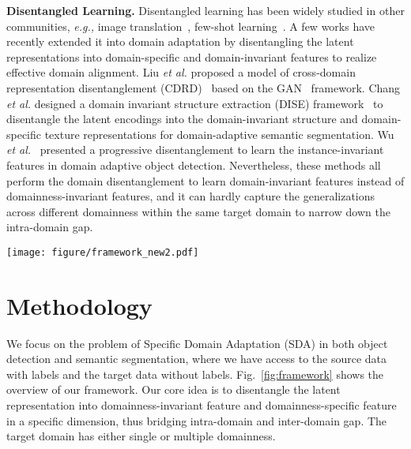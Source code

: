 \documentclass[10pt,journal,compsoc]{IEEEtran}
\begin{document}
\noindent \textbf{Disentangled Learning.} 
Disentangled learning has been widely studied in other communities, \emph{e.g.,} image translation~\cite{huang2018multimodal,lee2018diverse}, few-shot learning~\cite{ridgeway2018learning,scott2018adapted}. 
A few works have recently extended it into domain adaptation by disentangling the latent representations into domain-specific and domain-invariant features to realize effective domain alignment. 
Liu \emph{et al.} proposed a model of cross-domain representation disentanglement (CDRD)~\cite{liu2018detach} based on the GAN~\cite{GAN} framework. Chang \emph{et al.} designed a domain invariant structure extraction (DISE) framework~\cite{DISE} to disentangle the latent encodings into the domain-invariant structure and domain-specific texture representations for domain-adaptive semantic segmentation. Wu \emph{et al.}~\cite{IID} presented a progressive disentanglement to learn the instance-invariant features in domain adaptive object detection. 
Nevertheless, these methods all perform the domain disentanglement to learn domain-invariant features instead of domainness-invariant features, and it
can hardly capture the generalizations across different domainness within the same target domain to narrow down the intra-domain gap.


\begin{figure*}[t]
\centering
\texttt{[image: figure/framework\_new2.pdf]}
\caption{Overview of the proposed Self-Adversarial Disentangling (SAD) framework for specific domain adaptation (SAD). Our Domainness Creator (DC) not only generates a diversified source image with random domainness, but also provides additional supervisory signals  for guiding the feature disentangling. The encoder  and  are to extract the domainness-specific representations  and the domainness-invariant representations , respectively. With the guidance of the generated domainness, ,  and SAR (Self-Adversarial Regularizer) work in an adversarial manner, \emph{i.e.,} two opposite loss functions, to disentangle the latent representations into  and   (Best viewed in color). 
}
\label{fig:framework}
\end{figure*}




\section{Methodology}
We focus on the problem of Specific Domain Adaptation (SDA) in both object detection and semantic segmentation, where we have access to the source data  with labels  and the target data  without labels.  Fig.~\ref{fig:framework} shows the overview of our framework. Our core idea is to disentangle  the  latent  representation into  domainness-invariant feature and domainness-specific feature in a specific  dimension, thus bridging intra-domain and inter-domain gap. The target domain has either single or multiple domainness. 
\end{document}
